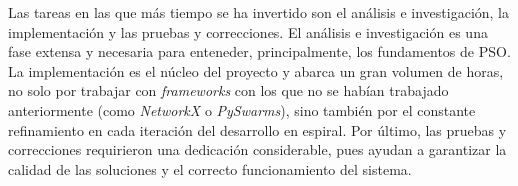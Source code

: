 Las tareas en las que más tiempo se ha invertido son el análisis e investigación, la implementación y las pruebas y correcciones. El análisis e investigación es una fase extensa y necesaria para enteneder, principalmente, los fundamentos de PSO. La implementación es el núcleo del proyecto y abarca un gran volumen de horas, no solo por trabajar con \textit{frameworks} con los que no se habían trabajado anteriormente (como \textit{NetworkX} o \textit{PySwarms}), sino también por el constante refinamiento en cada iteración del desarrollo en espiral. Por último, las pruebas y correcciones requirieron una dedicación considerable, pues ayudan a garantizar la calidad de las soluciones y el correcto funcionamiento del sistema.